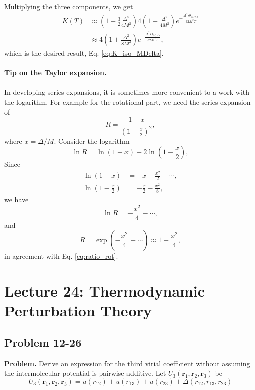\documentclass[twocolumn, 10pt]{article}
\numberwithin{equation}{section}
\newenvironment{problem}
{\par\medskip \color{problue}
  \textbf{Problem. }\ignorespaces}
{\medskip}
\newenvironment{solution}[1][\empty]
{\par\medskip\sffamily
  \textbf{\ifx\empty#1{Solution.}\relax\else{#1}\fi} \ignorespaces}
{\medskip}
\begin{document}
\begin{solution}
  Multiplying the three components, we get
  \begin{align*}
    K(T)
    &\approx
    \left( 1 + \frac{3}{2} \frac{\Delta^2}{4M^2} \right)
    4\left(1 - \frac{\Delta^2}{4M^2} \right)
    e^{-\frac{ \Delta^2 \, \Theta_{M, \mathrm{vib}} }
             { 32 M^2 T } }
    \\
    &\approx
    4 \left( 1 + \frac{\Delta^2}{8M^2} \right)
    e^{-\frac{ \Delta^2 \, \Theta_{M, \mathrm{vib}} }
             { 32 M^2 T } }
    ,
  \end{align*}
  which is the desired result, Eq. \eqref{eq:K_iso_MDelta}.

  \paragraph*{Tip on the Taylor expansion.}

  In developing series expansions,
  it is sometimes more convenient to a work with the logarithm.
  For example for the rotational part,
  we need the series expansion of
  $$
  R = \frac{ 1 - x } { \left(1 - \frac x 2 \right)^2 },
  $$
  where $x = \Delta/M$.
  Consider the logarithm 
  $$
  \ln R = \ln(1-x) - 2\ln\left(1 - \frac x 2 \right),
  $$
  Since
  \begin{align*}
    \ln(1- x) &= -x - \frac{x^2}{2} - \cdots, \\
    \ln\left(1 - \frac x 2 \right) &=
    -\frac{x}{2} - \frac{x^2}{8},
  \end{align*}
  we have
  $$
  \ln R = -\frac{x^2}{4} - \cdots,
  $$
  and
  $$
  R = \exp\left( -\frac{x^2}{4} - \cdots \right) \approx 1 - \frac{x^2}{4},
  $$
  in agreement with Eq. \eqref{eq:ratio_rot}.
\end{solution}


\section{Lecture 24: Thermodynamic Perturbation Theory}

\subsection{Problem 12-26}

\begin{problem}
  Derive an expression for the third virial coefficient
  without assuming the intermolecular potential is pairwise
  additive. Let $U_3(\mathbf r_1, \mathbf r_2, \mathbf r_3)$ be
  $$
  U_3(\mathbf r_1, \mathbf r_2, \mathbf r_3)
  =
  u(r_{12}) + u(r_{13}) + u(r_{23})
  + \Delta(r_{12}, r_{13}, r_{23})
  $$
\end{problem}
\end{document}
